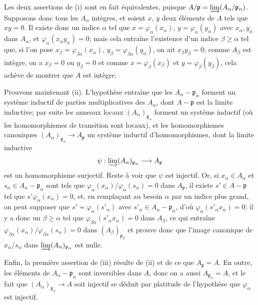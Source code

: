 \documentclass[10pt,oneside]{book}
\begin{document}
Les deux assertions de (i) sont en fait équivalentes, puisque
$A/\mathfrak p=\varinjlim(A_\alpha/\mathfrak p_\alpha)$. Supposons donc tous
les $A_\alpha$ intègres, et soient $x$, $y$ deux éléments de $A$ tels que
$xy=0$. Il existe donc un indice $\alpha$ tel que
$x=\varphi_\alpha(x_\alpha)$, $y=\varphi_\alpha(y_\alpha)$ avec
$x_\alpha,y_\alpha$ dans $A_\alpha$, et
$\varphi_\alpha(x_\alpha y_\alpha)=0$; mais cela entraîne l'existence d'un
indice $\beta\geq\alpha$ tel que, si l'on pose
$x_\beta=\varphi_{\beta\alpha}(x_\alpha)$,
$y_\beta=\varphi_{\beta\alpha}(y_\alpha)$, on ait $x_\beta y_\beta=0$; comme
$A_\beta$ est intègre, on a $x_\beta=0$ ou $y_\beta=0$ et comme
$x=\varphi_\beta(x_\beta)$ et $y=\varphi_\beta(y_\beta)$, cela achève de
montrer que $A$ est intègre.

Prouvons maintenant (ii). L'hypothèse entraîne que les
$A_\alpha-\mathfrak p_\alpha$ forment un système inductif de parties
multiplicatives des $A_\alpha$, dont $A-\mathfrak p$ est la limite inductive;
par suite les anneaux locaux $(A_\alpha)_{\mathfrak p_\alpha}$ forment un
système inductif (où les homomorphismes de transition sont locaux), et les
homomorphismes canoniques
$(A_\alpha)_{\mathfrak p_\alpha}\to A_{\mathfrak p}$ un système inductif
d'homomorphismes, dont la limite inductive
\[
\psi:\varinjlim (A_\alpha)_{\mathfrak p_\alpha}
\longrightarrow A_{\mathfrak p}
\]
est un homomorphisme surjectif. Reste à voir que $\psi$ est injectif. Or, si
$x_\alpha\in A_\alpha$ et
$s_\alpha\in A_\alpha-\mathfrak p_\alpha$ sont tels que
$\varphi_\alpha(x_\alpha)/\varphi_\alpha(s_\alpha)=0$ dans $A_{\mathfrak p}$,
il existe $s'\in A-\mathfrak p$ tel que
$s'\varphi_\alpha(x_\alpha)=0$, et, en remplaçant au besoin $\alpha$ par un
indice plus grand, on peut supposer que $s'=\varphi_\alpha(s'_\alpha)$ avec
$s'_\alpha\in A_\alpha-\mathfrak p_\alpha$, d'où
$\varphi_\alpha(s'_\alpha x_\alpha)=0$; il y a donc un $\beta\geq\alpha$ tel
que $\varphi_{\beta\alpha}(s'_\alpha x_\alpha)=0$ dans $A_\beta$, ce qui
entraîne
$\varphi_{\beta\alpha}(x_\alpha)/\varphi_{\beta\alpha}(s_\alpha)=0$ dans
$(A_\beta)_{\mathfrak p_\beta}$ et prouve donc que l'image canonique de
$x_\alpha/s_\alpha$ dans
$\varinjlim(A_\alpha)_{\mathfrak p_\alpha}$ est nulle.

Enfin, la première assertion de (iii) résulte de (ii) et de ce que
$A_{\mathfrak p}=A$. En outre, les éléments de
$A_\alpha-\mathfrak p_\alpha$ sont inversibles dans $A$, donc on a aussi
$A_{\mathfrak p_\alpha}=A$, et le fait que
$(A_\alpha)_{\mathfrak p_\alpha}\to A$ soit injectif se déduit par platitude
de l'hypothèse que $\varphi_\alpha$ est injectif.
\end{document}
